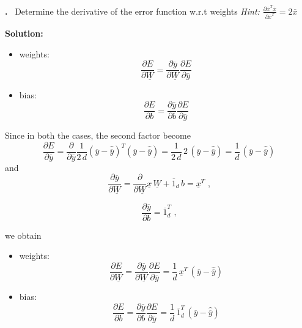 \documentclass[a4paper,12pt]{article} %
\newcounter{problem}
\newcounter{solution}
\newcommand\Problem{%
	\stepcounter{problem}%
	\textbf{\theproblem.}~%
	\setcounter{solution}{0}%
}
\newcommand\Solution{%
	\textbf{Solution:}\\%
}
\begin{document}
	\Problem{Determine the derivative of the error function w.r.t weights 
	\textit{Hint: $\frac{\partial 
	\overline{x}^T\overline{x}}{\partial\overline{x}^T} = 
	2\overline{x}$}}\medskip
	
	\Solution{	
		\begin{itemize}
			\item weights:
			\begin{equation}
			\frac{\partial E}{\partial \underline{W}}= \frac{\partial 
				\overline{y}}{\partial \underline{W}}\frac{\partial E}{\partial 
				\overline{y}}
			\end{equation}
			\item bias:
			\begin{equation}
			\frac{\partial E}{\partial {b}}= \frac{\partial 
				\overline{y}}{\partial {b}}\frac{\partial E}{\partial 
				\overline{y}}
			\end{equation}
		\end{itemize}
		
		Since in both the cases, the second factor become 
		\begin{equation*}
		\frac{\partial E}{\partial \overline{y}} = \frac{\partial }{\partial 
			\overline{y}} 
		\frac{1}{2  \, d} (\overline{y} - \hat{\overline{y}})^T (\overline{y} - 
		\hat{\overline{y}})
		= 
		\frac{1}{2 \, d}\, 2 \, (\overline{y}-\hat{\overline{y}}) = \frac{1}{d} 
		\, (\overline{y}-\hat{\overline{y}})
		\end{equation*}
		and
		\begin{equation*}
			\frac{\partial \overline{y}}{\partial\underline{W}}= 
			\frac{\partial}{\partial\underline{W}}\underline{x} \, 
			\underline{W} + \overline{1}_d \, b = \underline{x}^T \mbox{ ,}
		\end{equation*}
		 
		\begin{equation*}
			\frac{\partial \overline{y}}{\partial{b}}=\overline{1}_d^T \mbox{ ,}
		\end{equation*}
	
		we obtain
		
		\begin{itemize}
			\item weights:
			\begin{equation}\label{equation: weights}
			\frac{\partial E}{\partial \underline{W}}= \frac{\partial 
			\overline{y}}{\partial \underline{W}}\frac{\partial E}{\partial 
			\overline{y}} = \frac{1}{d} \, \underline{x}^T \, (\overline{y} - 
			\hat{\overline{y}})
			\end{equation}
			
			\item bias:
			\begin{equation}\label{equation: bias}
			\frac{\partial E}{\partial {b}}= \frac{\partial 
			\overline{y}}{\partial {b}}\frac{\partial E}{\partial \overline{y}} 
			= \frac{1}{d} \, \overline{1}_d^T \, (\overline{y} - 
			\hat{\overline{y}})
			\end{equation}
			
		\end{itemize}
	}\vspace{0.4cm}
	
\end{document}
